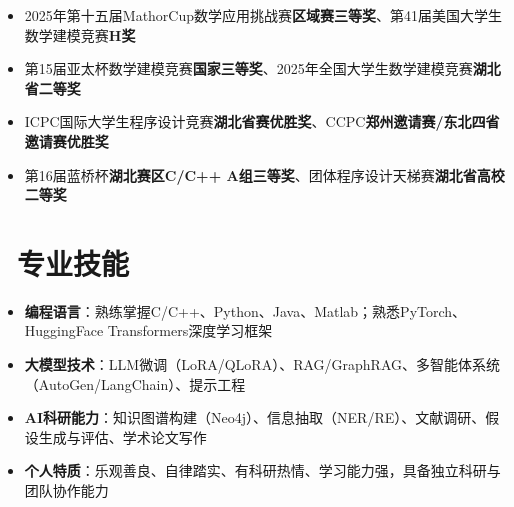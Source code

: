 \documentclass[8pt]{resume}
\begin{document}

\begin{itemize}[itemsep=-1pt, parsep=1pt]
  \item 2025年第十五届MathorCup数学应用挑战赛\textbf{区域赛三等奖}、第41届美国大学生数学建模竞赛\textbf{H奖}
  \item 第15届亚太杯数学建模竞赛\textbf{国家三等奖}、2025年全国大学生数学建模竞赛\textbf{湖北省二等奖}
\end{itemize}


\begin{itemize}[itemsep=-1pt, parsep=1pt]
  \item ICPC国际大学生程序设计竞赛\textbf{湖北省赛优胜奖}、CCPC\textbf{郑州邀请赛/东北四省邀请赛优胜奖}
  \item 第16届蓝桥杯\textbf{湖北赛区C/C++ A组三等奖}、团体程序设计天梯赛\textbf{湖北省高校二等奖}
\end{itemize}

\section{\faCogs\ 专业技能}
\begin{itemize}[parsep=0.5ex, itemsep=-1pt]
  \item \textbf{编程语言}：熟练掌握C/C++、Python、Java、Matlab；熟悉PyTorch、HuggingFace Transformers深度学习框架
  \item \textbf{大模型技术}：LLM微调（LoRA/QLoRA）、RAG/GraphRAG、多智能体系统（AutoGen/LangChain）、提示工程
  \item \textbf{AI科研能力}：知识图谱构建（Neo4j）、信息抽取（NER/RE）、文献调研、假设生成与评估、学术论文写作
  \item \textbf{个人特质}：乐观善良、自律踏实、有科研热情、学习能力强，具备独立科研与团队协作能力
\end{itemize}
\end{document}
